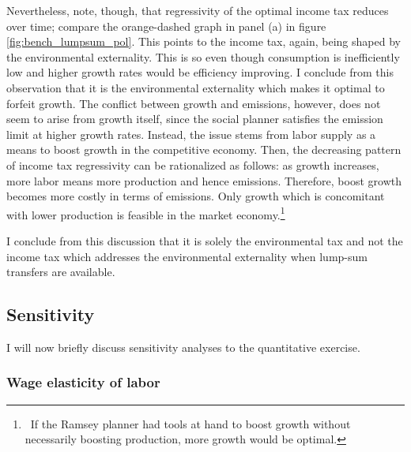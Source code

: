 Nevertheless, note, though, that regressivity of the optimal income tax reduces over time; compare the orange-dashed graph in panel (a) in figure \ref{fig:bench_lumpsum_pol}. This points to the income tax, again, being shaped by the environmental externality.
This is so even though consumption is inefficiently low and higher growth rates would be efficiency improving. I conclude from this observation that it is the environmental externality which makes it optimal to forfeit growth. 
The conflict between growth and emissions, however, does not seem to arise from growth itself, since the social planner satisfies the emission limit at higher growth rates. Instead, the issue stems from labor supply as a means to boost growth in the competitive economy. 
Then, the decreasing pattern of income tax regressivity can be rationalized as follows: as growth increases, more labor means more production and hence emissions. Therefore, boost growth becomes more costly in terms of emissions. Only growth which is concomitant with lower production is feasible in the market economy.\footnote{\ If the Ramsey planner had tools at hand to boost growth without necessarily boosting production, more growth would be optimal. }

I conclude from this discussion that it is solely the environmental tax and not the income tax which addresses the environmental externality when lump-sum transfers are available.

\subsection{Sensitivity}
I will now briefly discuss sensitivity analyses to the quantitative exercise. 
\subsubsection{Wage elasticity of labor}

